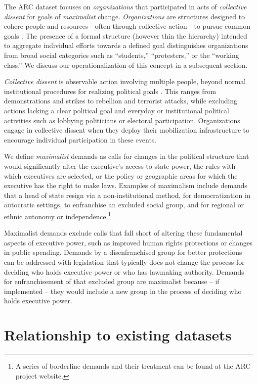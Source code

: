 The ARC dataset focuses on \emph{organizations} that participated in acts of \emph{collective dissent} for goals of \emph{maximalist} change. \textit{Organizations} are structures designed to cohere people and resources - often through collective action - to pursue common goals \citep[2]{North1990, Daft1992}. 
The presence of a formal structure (however thin the hierarchy) intended to aggregate individual efforts towards a defined goal distinguishes organizations from broad social categories such as ``students,'' ``protesters,'' or the ``working class.'' We discuss our operationalization of this concept in a subsequent section.    

\emph{Collective dissent} is observable action involving multiple people, beyond normal institutional procedures for realizing political goals \citep{Tilly1978}. This ranges from demonstrations and strikes to rebellion and terrorist attacks, while excluding actions lacking a clear political goal and everyday or institutional political activities such as lobbying politicians or electoral participation. Organizations engage in collective dissent when they deploy their mobilization infrastructure to encourage individual participation in these events.  

We define \emph{maximalist} demands as calls for changes in the political structure that would significantly alter the executive's access to state power, the rules with which executives are selected, or the policy or geographic areas for which the executive has the right to make laws. Examples of maximalism include demands that a head of state resign via a non-institutional method, for democratization in autocratic settings, to enfranchise an excluded social group, and for regional or ethnic autonomy or independence.\footnote{A series of borderline demands and their treatment can be found at the ARC project website.}

Maximalist demands exclude calls that fall short of altering these fundamental aspects of executive power, such as improved human rights protections or changes in public spending. Demands by a disenfranchised group for better protections can be addressed with legislation that typically does not change the process for deciding who holds executive power or who has lawmaking authority. Demands for enfranchisement of that excluded group are maximalist because -- if implemented -- they would include a new group in the process of deciding who holds executive power. 


\section{Relationship to existing datasets}

